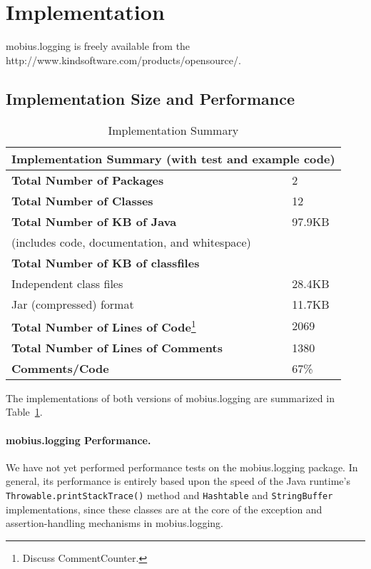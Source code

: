 \documentclass{article}
\begin{document}
\section{Implementation}

mobius.logging is freely available from the 
{http://www.kindsoftware.com/products/opensource/}.

\subsection{Implementation Size and Performance}

\begin{table}[htbp]
  \begin{center}
    \begin{tabular}{|l|l|}
      \hline
      \multicolumn{2}{|c|}{Implementation Summary (with test and
        example code)}
      \\ \hline\hline
      \textbf{Total Number of Packages} & 2 \\ \hline
      \textbf{Total Number of Classes} & 12 \\ \hline
      \textbf{Total Number of KB of Java} & 97.9KB \\
      (includes code, documentation, and whitespace) & \\ \hline
      \textbf{Total Number of KB of classfiles} & \\
      Independent class files & 28.4KB \\
      Jar (compressed) format & 11.7KB \\ \hline
      \textbf{Total Number of Lines of Code}\footnote{Discuss 
        CommentCounter.} & 2069 \\ \hline
      \textbf{Total Number of Lines of Comments} & 1380 \\ \hline
      \textbf{Comments/Code} & 67\% \\ \hline
    \end{tabular}
    \caption{Implementation Summary}
    \label{tab:impl_summary}
  \end{center}
\end{table}

The implementations of both versions of mobius.logging are summarized in
Table~\ref{tab:impl_summary}.

\paragraph{mobius.logging Performance.} 
We have not yet performed performance tests on the mobius.logging package.  In
general, its performance is entirely based upon the speed of the Java
runtime's \texttt{Throwable.printStackTrace()} method and
\texttt{Hashtable} and \texttt{StringBuffer} implementations, since
these classes are at the core of the exception and assertion-handling
mechanisms in mobius.logging.
\end{document}
